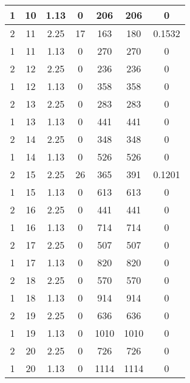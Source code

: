 \documentclass[letterpaper, 12pt]{article}
\begin{document}
\begin{longtable}{|c|c|c|c|c|c|c|}
\hline
1 & 10 & 1.13 & 0 & 206 & 206 & 0 \\
\hline
2 & 11 & 2.25 & 17 & 163 & 180 & 0.1532 \\
\hline
1 & 11 & 1.13 & 0 & 270 & 270 & 0 \\
\hline
2 & 12 & 2.25 & 0 & 236 & 236 & 0 \\
\hline
1 & 12 & 1.13 & 0 & 358 & 358 & 0 \\
\hline
2 & 13 & 2.25 & 0 & 283 & 283 & 0 \\
\hline
1 & 13 & 1.13 & 0 & 441 & 441 & 0 \\
\hline
2 & 14 & 2.25 & 0 & 348 & 348 & 0 \\
\hline
1 & 14 & 1.13 & 0 & 526 & 526 & 0 \\
\hline
2 & 15 & 2.25 & 26 & 365 & 391 & 0.1201 \\
\hline
1 & 15 & 1.13 & 0 & 613 & 613 & 0 \\
\hline
2 & 16 & 2.25 & 0 & 441 & 441 & 0 \\
\hline
1 & 16 & 1.13 & 0 & 714 & 714 & 0 \\
\hline
2 & 17 & 2.25 & 0 & 507 & 507 & 0 \\
\hline
1 & 17 & 1.13 & 0 & 820 & 820 & 0 \\
\hline
2 & 18 & 2.25 & 0 & 570 & 570 & 0 \\
\hline
1 & 18 & 1.13 & 0 & 914 & 914 & 0 \\
\hline
2 & 19 & 2.25 & 0 & 636 & 636 & 0 \\
\hline
1 & 19 & 1.13 & 0 & 1010 & 1010 & 0 \\
\hline
2 & 20 & 2.25 & 0 & 726 & 726 & 0 \\
\hline
1 & 20 & 1.13 & 0 & 1114 & 1114 & 0 \\
\hline
\end{longtable}
\end{document}
